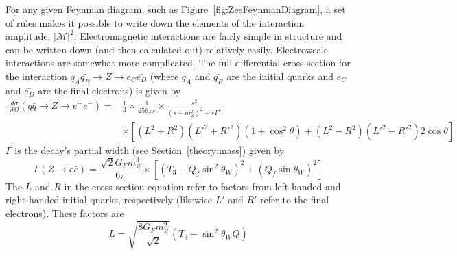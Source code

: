 
For any given Feynman diagram, 
such as Figure~\ref{fig:ZeeFeynmanDiagram}, 
a set of rules makes it possible to write 
down the elements of the interaction amplitude, 
$\left| \mathcal{M} \right| ^2$.  
Electromagnetic interactions are fairly 
simple in structure and can be written down 
(and then calculated out) relatively easily.  
Electroweak interactions are somewhat 
more complicated.  
The full differential cross section for the interaction 
$ q_A \bar{q_B} \rightarrow Z \rightarrow e_{C} \bar{e_{D}} $
(where $q_A$ and $\bar{q_B}$ are the initial quarks 
and $e_{C}$ and $\bar{e_{D}}$ are the final electrons) is given by 
\cite{PdgRpp}
\begin{align*}
\frac{d \sigma}{d \Omega} 
( q \bar{q} \rightarrow Z \rightarrow e^+ e^- ) 
= &\frac{1}{3} 
\times \frac{1}{256 \pi s} 
\times \frac{s^2}{(s - m_Z^2)^2 + s \Gamma^2} \\
&\times \left[(L^2 + R^2) (L'^2 + R'^2) (1 + \cos^2 \theta)
+ (L^2 - R^2) (L'^2 - R'^2) 2 \cos \theta \right]
\end{align*}
$\Gamma$ is the \Zee decay's 
partial width (see Section~\ref{theory:mass}) 
given by %
\[
\Gamma (Z \rightarrow e \bar{e} )
= \frac{ \sqrt{2} G_F m_Z^3 }{6 \pi}
\times \left[(T_3 - Q_f \sin^2 \theta_W )^2 
+ (Q_f \sin \theta_W )^2 \right]
\]
The $L$ and $R$ in the cross section equation 
refer to factors from %
left-handed and right-handed initial quarks, respectively 
(likewise $L'$ and $R'$ refer to the final electrons).  
These factors are 
\[
L = \sqrt{ \frac{8 G_F m_Z^2}{\sqrt{2} } }(T_3 - \sin^2 \theta_W Q)
\]
